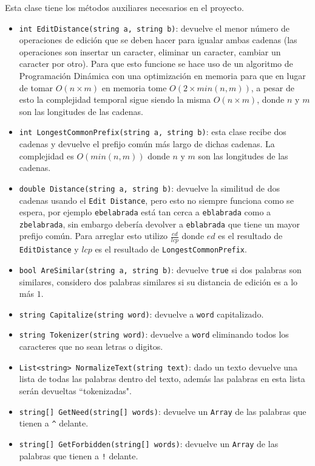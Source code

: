 \documentclass[a4paper, 12pt]{article}
\begin{document}
Esta clase tiene los métodos auxiliares necesarios en el proyecto.

\begin{itemize}
	\item {\tt int EditDistance(string a, string b)}:  devuelve el menor número de operaciones de edición
	      que se deben hacer para igualar ambas cadenas (las operaciones son insertar un caracter, eliminar un caracter,
	      cambiar un caracter por otro). Para que esto funcione se hace uso de un algoritmo de Programación Dinámica con una
	      optimización en memoria para que en lugar de tomar $O(n \times m)$ en memoria tome $O(2 \times min(n, m))$,
	      a pesar de esto la complejidad temporal sigue siendo la misma $O(n \times m)$, donde $n$ y $m$ son las longitudes de las cadenas.
	\item {\tt int LongestCommonPrefix(string a, string b)}: esta clase recibe dos cadenas y
	      devuelve el prefijo común más largo de dichas cadenas. La complejidad es $O(min(n, m))$ donde $n$ y $m$
	      son las longitudes de las cadenas.
	\item {\tt double Distance(string a, string b)}: devuelve la similitud de dos cadenas usando el {\tt Edit Distance}, pero
	      esto no siempre funciona como se espera, por ejemplo {\tt ebelabrada} está tan cerca a {\tt eblabrada} como a {\tt zbelabrada},
	      sin embargo debería devolver a {\tt eblabrada} que tiene un mayor prefijo común. Para arreglar esto utilizo
	      $\frac{ed}{lcp}$ donde $ed$ es el resultado de {\tt EditDistance} y $lcp$ es el resultado de {\tt LongestCommonPrefix}.
	\item {\tt bool AreSimilar(string a, string b)}: devuelve {\tt true} si dos palabras son similares, considero dos palabras
	      similares si su distancia de edición es a lo más $1$.
	\item {\tt string Capitalize(string word)}: devuelve a {\tt word} capitalizado.
	\item {\tt string Tokenizer(string word)}: devuelve a {\tt word} eliminando todos los caracteres que no sean letras o digitos.
	\item {\tt List<string> NormalizeText(string text)}: dado un texto devuelve una lista de todas las palabras dentro del texto,
	      además las palabras en esta lista serán devueltas ``tokenizadas".
	\item {\tt string[] GetNeed(string[] words)}: devuelve un {\tt Array} de las palabras que tienen a {\tt \^{}} delante.
	\item {\tt string[] GetForbidden(string[] words)}: devuelve un {\tt Array} de las palabras que tienen a {\tt !} delante.

\end{itemize}
\end{document}
